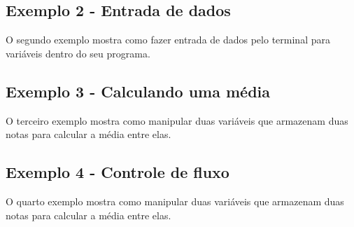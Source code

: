 \documentclass[12pt]{article}
\begin{document}
\subsection{Exemplo 2 - Entrada de dados}

O segundo exemplo mostra como fazer entrada de dados pelo terminal para variáveis dentro do seu programa.



\subsection{Exemplo 3 - Calculando uma média}

O terceiro exemplo mostra como manipular duas variáveis que armazenam duas notas para calcular a média entre elas.

        

        






\subsection{Exemplo 4 - Controle de fluxo}

O quarto exemplo  mostra como manipular duas variáveis que armazenam duas notas para calcular a média entre elas.

        
\end{document}
